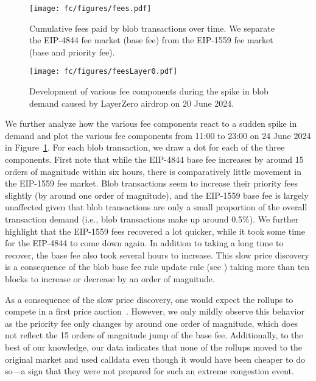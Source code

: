 \begin{figure}[t]\vspace{-6pt}
\centering

\begin{minipage}[t]{.48\linewidth}
    \centering
    \texttt{[image: fc/figures/fees.pdf]}\vspace{-6pt}
    \caption{Cumulative fees paid by blob transactions over time. We separate the EIP-4844 fee market (base fee) from the EIP-1559 fee market (base and priority fee).}
    \label{fig:fees}
\end{minipage}
\hfill
\begin{minipage}[t]{.48\linewidth}
    \centering
     \texttt{[image: fc/figures/feesLayer0.pdf]}\vspace{-6pt}
    \caption{Development of various fee components during the spike in blob demand caused by LayerZero airdrop on 20 June 2024.}
    \label{fig:feesLayer0}
\end{minipage}
\end{figure}

We further analyze how the various fee components react to a sudden spike in demand and plot the various fee components from 11:00 to 23:00 on 24 June 2024 in Figure~\ref{fig:feesLayer0}. For each blob transaction, we draw a dot for each of the three components. First note that while the EIP-4844 base fee increases by around 15 orders of magnitude within six hours, there is comparatively little movement in the EIP-1559 fee market. Blob transactions seem to increase their priority fees slightly (by around one order of magnitude), and the EIP-1559 base fee is largely unaffected given that blob transactions are only a small proportion of the overall transaction demand (i.e., blob transactions make up around 0.5\%). We further highlight that the EIP-1559 fees recovered a lot quicker, while it took some time for the EIP-4844 to come down again. In addition to taking a long time to recover, the base fee also took several hours to increase. This slow price discovery is a consequence of the blob base fee rule update rule (see ) taking more than ten blocks to increase or decrease by an order of magnitude. 

As a consequence of the slow price discovery, one would expect the rollups to compete in a first price auction~\parencite{buterin2024multidimensional,dataalways2024minimumblobfees}. However, we only mildly observe this behavior as the priority fee only changes by around one order of magnitude, which does not reflect the 15 orders of magnitude jump of the base fee. Additionally, to the best of our knowledge, our data indicates that none of the rollups moved to the original market and used calldata even though it would have been cheaper to do so---a sign that they were not prepared for such an extreme congestion event.

